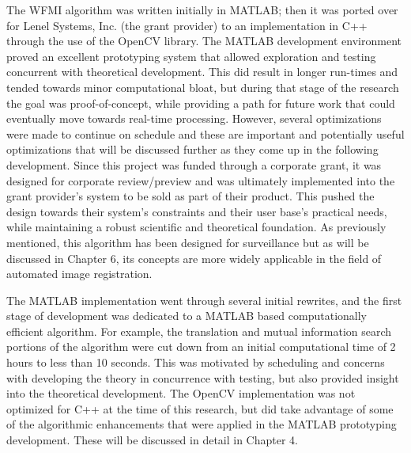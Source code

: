 %
%
%
%
%
%

%
%
%



The WFMI algorithm was written initially in MATLAB\textsuperscript{\textregistered}; then it was ported over for Lenel Systems, Inc. (the grant provider) to an implementation in C++ through the use of the OpenCV library. The MATLAB\textsuperscript{\textregistered} development environment proved an excellent prototyping system that allowed exploration and testing concurrent with theoretical development. This did result in longer run-times and tended towards minor computational bloat, but during that stage of the research the goal was proof-of-concept, while providing a path for future work that could eventually move towards real-time processing. However, several optimizations were made to continue on schedule and these are important and potentially useful optimizations that will be discussed further as they come up in the following development. Since this project was funded through a corporate grant, it was designed for corporate review/preview and was ultimately implemented into the grant provider's system to be sold as part of their product. This pushed the design towards their system's constraints and their user base's practical needs, while maintaining a robust scientific and theoretical foundation. As previously mentioned, this algorithm has been designed for surveillance but as will be discussed in Chapter 6, its concepts are more widely applicable in the field of automated image registration.

The MATLAB\textsuperscript{\textregistered} implementation went through several initial rewrites, and the first stage of development was dedicated to a MATLAB\textsuperscript{\textregistered} based computationally efficient algorithm. For example, the translation and mutual information search portions of the algorithm were cut down from an initial computational time of 2 hours to less than 10 seconds. This was motivated by scheduling and concerns with developing the theory in concurrence with testing, but also provided insight into the theoretical development. The OpenCV implementation was not optimized for C++ at the time of this research, but did take advantage of some of the algorithmic enhancements that were applied in the MATLAB\textsuperscript{\textregistered} prototyping development. These will be discussed in detail in Chapter 4.


